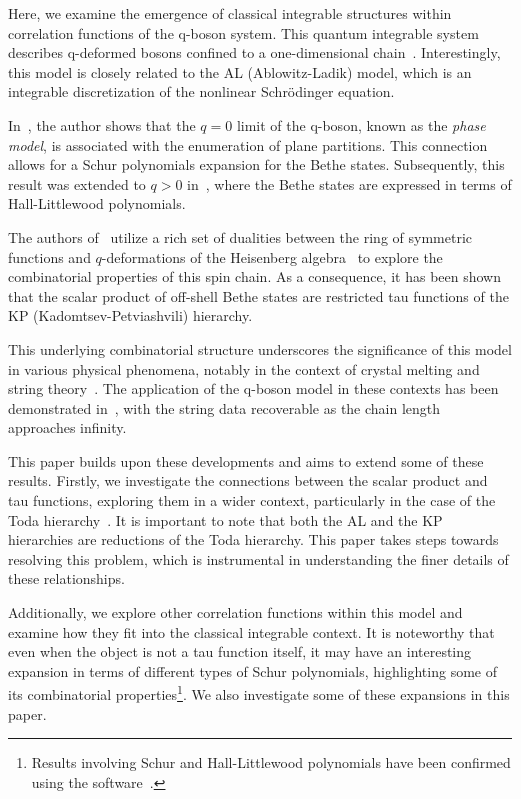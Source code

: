 \documentclass[a4paper,11pt]{amsart}
\begin{document}
Here, we examine the emergence of classical integrable structures
within correlation functions of the q-boson system. This quantum
integrable system describes q-deformed bosons confined to a
one-dimensional chain~\cite{Bogoliubov:1992, Bogoliubov:1997soj,
  Bogoliubov2005}.  Interestingly, this model is closely related to
the AL (Ablowitz-Ladik) model, which is an integrable discretization
of the nonlinear Schrödinger equation.

In~\cite{Bogoliubov2005}, the author shows that the \(q = 0\)
limit of the q-boson, known as the \emph{phase model}, is associated
with the enumeration of plane partitions. This connection allows for a
Schur polynomials expansion for the Bethe states. Subsequently, this
result was extended to \(q > 0\) in~\cite{Tsilevich:2006}, where the
Bethe states are expressed in terms of Hall-Littlewood polynomials.

The authors of~\cite{Foda:2008hn, Wheeler:2010vmq} utilize a rich
set of dualities between the ring of symmetric functions and
\(q\)-deformations of the Heisenberg algebra~\cite{Jing1991, Jing1995}
to explore the combinatorial properties of this spin chain. As a
consequence, it has been shown that the scalar product of off-shell
Bethe states are restricted tau functions of the KP
(Kadomtsev-Petviashvili) hierarchy.

This underlying combinatorial structure underscores the significance
of this model in various physical phenomena, notably in the context of
crystal melting and string theory~\cite{Okounkov:2003sp,
  Saulina:2004da}.  The application of the q-boson model in these
contexts has been demonstrated in~\cite{Sulkowski:2008mx}, with the
string data recoverable as the chain length approaches infinity.

This paper builds upon these developments and aims to extend some of
these results. Firstly, we investigate the connections between the
scalar product and tau functions, exploring them in a wider context,
particularly in the case of the Toda
hierarchy~\cite{Takasaki:2018wsv}. It is important to note that both
the AL and the KP hierarchies are reductions of the Toda
hierarchy. This paper takes steps towards resolving this problem,
which is instrumental in understanding the finer details of these
relationships.

Additionally, we explore other correlation functions within this model
and examine how they fit into the classical integrable context. It is
noteworthy that even when the object is not a tau function itself, it
may have an interesting expansion in terms of different types of
Schur polynomials, highlighting some of its combinatorial
properties\footnote{Results involving Schur and Hall-Littlewood
polynomials have been confirmed using the
software~\cite{Araujo:2024piv}.}. We also investigate some of these
expansions in this paper.
\end{document}
